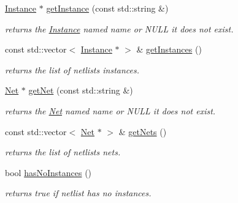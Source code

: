 \begin{DoxyCompactItemize}
\mbox{\hyperlink{class_open_chams_1_1_instance}{Instance}} $\ast$ \mbox{\hyperlink{class_open_chams_1_1_netlist_a6fbcd8c819bd0b576398ac031c2726fc}{get\+Instance}} (const std\+::string \&)
\begin{DoxyCompactList}\small\item\em returns the \mbox{\hyperlink{class_open_chams_1_1_instance}{Instance}} named {\ttfamily name} or N\+U\+LL it does not exist. \end{DoxyCompactList}\item 
\mbox{\label{class_open_chams_1_1_netlist_a8e6e58ffab876152a740092520c35d73}} 
const std\+::vector$<$ \mbox{\hyperlink{class_open_chams_1_1_instance}{Instance}} $\ast$ $>$ \& \mbox{\hyperlink{class_open_chams_1_1_netlist_a8e6e58ffab876152a740092520c35d73}{get\+Instances}} ()
\begin{DoxyCompactList}\small\item\em returns the list of netlist\textquotesingle{}s instances. \end{DoxyCompactList}\item 
\mbox{\hyperlink{class_open_chams_1_1_net}{Net}} $\ast$ \mbox{\hyperlink{class_open_chams_1_1_netlist_a18b468cdde5adf75e3057c8558972f52}{get\+Net}} (const std\+::string \&)
\begin{DoxyCompactList}\small\item\em returns the \mbox{\hyperlink{class_open_chams_1_1_net}{Net}} named {\ttfamily name} or N\+U\+LL it does not exist. \end{DoxyCompactList}\item 
\mbox{\label{class_open_chams_1_1_netlist_abf36db82efb99a8ec8ae4b454be00019}} 
const std\+::vector$<$ \mbox{\hyperlink{class_open_chams_1_1_net}{Net}} $\ast$ $>$ \& \mbox{\hyperlink{class_open_chams_1_1_netlist_abf36db82efb99a8ec8ae4b454be00019}{get\+Nets}} ()
\begin{DoxyCompactList}\small\item\em returns the list of netlist\textquotesingle{}s nets. \end{DoxyCompactList}\item 
\mbox{\label{class_open_chams_1_1_netlist_adab62a25face462baec9a7fffb2b6158}} 
bool \mbox{\hyperlink{class_open_chams_1_1_netlist_adab62a25face462baec9a7fffb2b6158}{has\+No\+Instances}} ()
\begin{DoxyCompactList}\small\item\em returns true if netlist has no instances. \end{DoxyCompactList}\item 

\end{DoxyCompactItemize}

